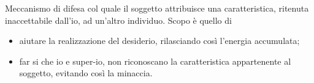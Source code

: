 \documentclass{subfiles}
\begin{document}
Meccanismo di difesa col quale il soggetto attribuisce una caratteristica, ritenuta inaccettabile dall'io, ad un'altro individuo.
Scopo è quello di
\begin{itemize}
    \item aiutare la realizzazione del desiderio, rilasciando così l'energia accumulata;
    \item far si che io e super-io, non riconoscano la caratteristica appartenente al soggetto, evitando così la minaccia.
\end{itemize}
\end{document}
